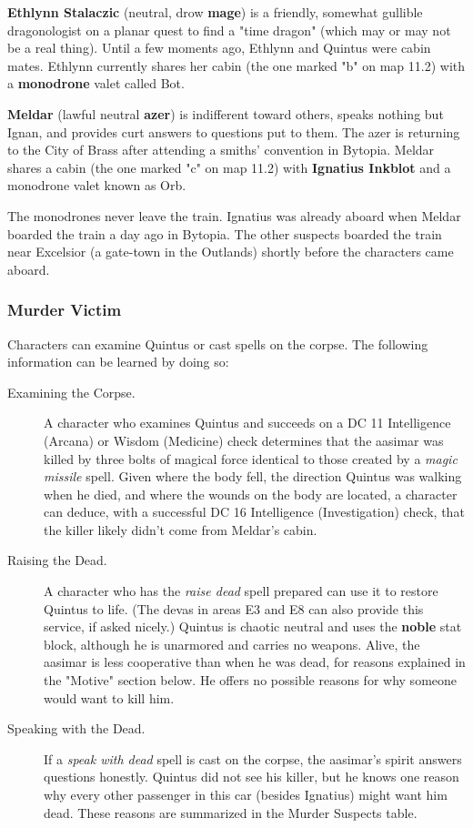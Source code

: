 \documentclass[10pt,a4paper,twoside,bg=print,twocolumn,openany,nodeprecatedcode]{dndarticle}
\begin{document}
\textbf{Ethlynn Stalaczic} (neutral, drow \textbf{mage}) is a friendly, somewhat gullible dragonologist on a planar quest to find a "time dragon" (which may or may not be a real thing). Until a few moments ago, Ethlynn and Quintus were cabin mates. Ethlynn currently shares her cabin (the one marked "b" on map 11.2) with a \textbf{monodrone} valet called Bot.

\textbf{Meldar} (lawful neutral \textbf{azer}) is indifferent toward others, speaks nothing but Ignan, and provides curt answers to questions put to them. The azer is returning to the City of Brass after attending a smiths' convention in Bytopia. Meldar shares a cabin (the one marked "c" on map 11.2) with \textbf{Ignatius Inkblot} and a monodrone valet known as Orb.

The monodrones never leave the train. Ignatius was already aboard when Meldar boarded the train a day ago in Bytopia. The other suspects boarded the train near Excelsior (a gate-town in the Outlands) shortly before the characters came aboard.

\subsubsection{Murder Victim}
Characters can examine Quintus or cast spells on the corpse. The following information can be learned by doing so:


\begin{description}
\item[Examining the Corpse.]
A character who examines Quintus and succeeds on a DC 11 Intelligence (Arcana) or Wisdom (Medicine) check determines that the aasimar was killed by three bolts of magical force identical to those created by a \textit{magic missile} spell. Given where the body fell, the direction Quintus was walking when he died, and where the wounds on the body are located, a character can deduce, with a successful DC 16 Intelligence (Investigation) check, that the killer likely didn't come from Meldar's cabin.
\item[Raising the Dead.]
A character who has the \textit{raise dead} spell prepared can use it to restore Quintus to life. (The devas in areas E3 and E8 can also provide this service, if asked nicely.) Quintus is chaotic neutral and uses the \textbf{noble} stat block, although he is unarmored and carries no weapons. Alive, the aasimar is less cooperative than when he was dead, for reasons explained in the "Motive" section below. He offers no possible reasons for why someone would want to kill him.
\item[Speaking with the Dead.]
If a \textit{speak with dead} spell is cast on the corpse, the aasimar's spirit answers questions honestly. Quintus did not see his killer, but he knows one reason why every other passenger in this car (besides Ignatius) might want him dead. These reasons are summarized in the Murder Suspects table.
\end{description}
\end{document}
